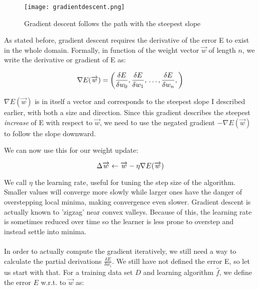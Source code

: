 \begin{figure}[ht]
  \centering
  \texttt{[image: gradientdescent.png]}
  \caption{Gradient descent follows the path with the steepest slope}
  \label{fig:gradient_descent}
\end{figure}

As stated before,
gradient descent requires the derivative of the error E
to exist in the whole domain.
Formally, in function of the weight vector
$\overrightarrow{w}$ of length $n$,
we write the derivative or gradient of E as:

\begin{equation}
\label{eq:gradient_descent_derivative}
  \nabla E(\overrightarrow{w}) = \left(
    \frac{\delta E}{\delta w_0}, \\
    \frac{\delta E}{\delta w_1}, \\
    \dots, \\
    \frac{\delta E}{\delta w_n}, \\
  \right)
\end{equation}

$\nabla E(\overrightarrow{w})$
is in itself a vector and corresponds to the steepest slope
I described earlier,
with both a size and direction.
Since this gradient describes the steepest
\textit{increase}
of E with respect to $\overrightarrow{w}$,
we need to use the negated gradient
$-\nabla E(\overrightarrow{w})$
to follow the slope downward.

We can now use this for our weight update:

\begin{equation}
\Delta \overrightarrow{w} \leftarrow \overrightarrow{w} - \\
\eta \nabla E(\overrightarrow{w})
\label{eq:gradient_descent}
\end{equation}

We call $\eta$ the learning rate,
useful for tuning the step size of the algorithm.
Smaller values will converge more slowly
while larger ones have the danger of overstepping local minima,
making convergence even slower.
Gradient descent is actually known to 'zigzag'
near convex valleys.
Because of this,
the learning rate is sometimes reduced over time
so the learner is less prone to overstep
and instead settle into minima.


\paragraph{}
In order to actually compute the gradient iteratively,
we still need a way to calculate the partial derivations
$\frac{\delta E}{\delta w_i}$.
We still have not defined the error E,
so let us start with that.
For a training data set $D$
and learning algorithm $\hat{f}$,
we define the error $E$ w.r.t. to
$\overrightarrow{w}$ as:

